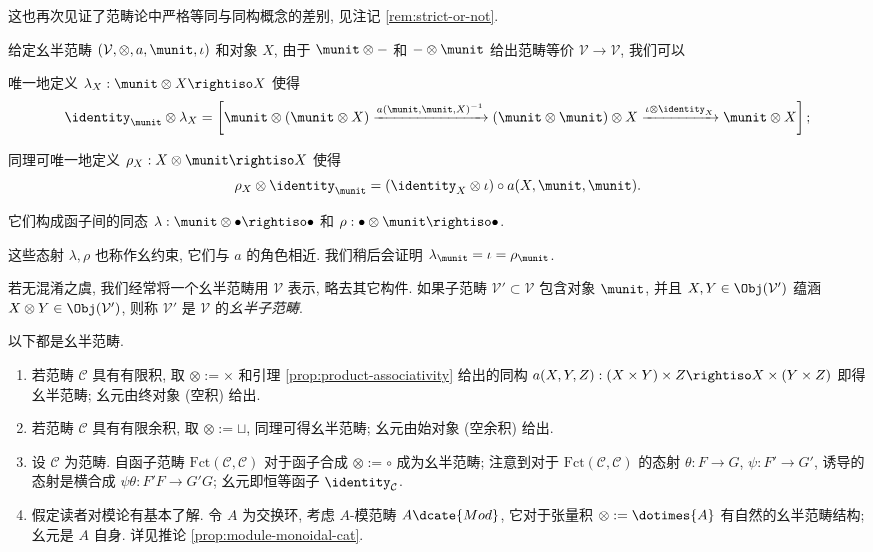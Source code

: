这也再次见证了范畴论中严格等同与同构概念的差别, 见注记 \ref{rem:strict-or-not}.

\begin{definition}\label{def:monoidal-constraints}
	给定幺半范畴 $(\mathcal{V}, \otimes, a, \munit, \iota)$ 和对象 $X$, 由于 $\munit \otimes -$ 和 $- \otimes \munit$ 给出范畴等价 $\mathcal{V} \to \mathcal{V}$, 我们可以
	\begin{compactitem}
		\item 唯一地定义 $ \lambda_X: \munit \otimes X \rightiso X$ 使得
			\[ \identity_{\munit} \otimes \lambda_X = \left[ \munit \otimes (\munit \otimes X) \xrightarrow{ a(\munit, \munit, X)^{-1} } (\munit \otimes \munit) \otimes X \xrightarrow{\iota \otimes \identity_X} \munit \otimes X \right] ; \]
		\item 同理可唯一地定义 $\rho_X: X \otimes \munit \rightiso X$ 使得
			\[ \rho_X \otimes \identity_{\munit} = (\identity_X \otimes \iota) \circ a(X, \munit, \munit). \]
	\end{compactitem}
	它们构成函子间的同态 $\lambda: \munit \otimes \bullet \rightiso \bullet$ 和 $\rho: \bullet \otimes \munit \rightiso \bullet$.
\end{definition}
这些态射 $\lambda, \rho$ 也称作幺约束, 它们与 $a$ 的角色相近. 我们稍后会证明 $\lambda_\munit = \iota = \rho_\munit$.

若无混淆之虞, 我们经常将一个幺半范畴用 $\mathcal{V}$ 表示, 略去其它构件. 如果子范畴 $\mathcal{V}' \subset \mathcal{V}$ 包含对象 $\munit$, 并且 $X,Y \in \Obj(\mathcal{V}')$ 蕴涵 $X \otimes Y \in \Obj(\mathcal{V}')$, 则称 $\mathcal{V}'$ 是 $\mathcal{V}$ 的\emph{幺半子范畴}. 

\begin{example}\label{eg:monoidal-cat}
	以下都是幺半范畴.
	\begin{enumerate}
		\item 若范畴 $\mathcal{C}$ 具有有限积, 取 $\otimes := \times$ 和引理 \ref{prop:product-associativity} 给出的同构 $a(X,Y,Z): (X \times Y) \times Z \rightiso X \times (Y \times Z)$ 即得幺半范畴; 幺元由终对象 (空积) 给出.
		\item 若范畴 $\mathcal{C}$ 具有有限余积, 取 $\otimes := \sqcup$, 同理可得幺半范畴; 幺元由始对象 (空余积) 给出.
		\item 设 $\mathcal{C}$ 为范畴. 自函子范畴 $\text{Fct}(\mathcal{C}, \mathcal{C})$ 对于函子合成 $\otimes := \circ$ 成为幺半范畴; 注意到对于 $\text{Fct}(\mathcal{C}, \mathcal{C})$ 的态射 $\theta: F \to G$, $\psi: F' \to G'$, 诱导的态射是横合成 $\psi\theta: F'F \to G'G$; 幺元即恒等函子 $\identity_{\mathcal{C}}$.
		\item 假定读者对模论有基本了解. 令 $A$ 为交换环, 考虑 $A$-模范畴 $A\dcate{Mod}$, 它对于张量积 $\otimes := \dotimes{A}$ 有自然的幺半范畴结构; 幺元是 $A$ 自身. 详见推论 \ref{prop:module-monoidal-cat}.
	\end{enumerate}
\end{example}


